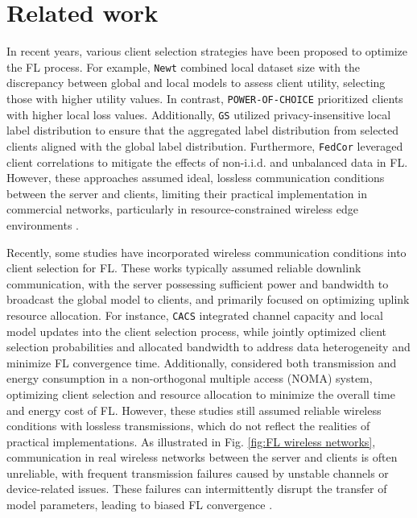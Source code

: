 \section{Related work}
In recent years, various client selection strategies have been proposed to optimize the FL process.
For example,
\texttt{Newt} \cite{zhao2022participant} combined local dataset size with the discrepancy between global and local models to assess client utility, selecting those with higher utility values.
In contrast, \texttt{POWER-OF-CHOICE} \cite{cho2022towards} prioritized clients with higher local loss values.
Additionally, \texttt{GS} \cite{ma2021client} utilized privacy-insensitive local label distribution to ensure that the aggregated label distribution from selected clients aligned with the global label distribution.
Furthermore, \texttt{FedCor} \cite{tang2022fedcor} leveraged client correlations to mitigate the effects of non-i.i.d. and unbalanced data in FL.
However, these approaches assumed ideal, lossless communication conditions between the server and clients,
limiting their practical implementation in commercial networks, particularly in resource-constrained wireless edge environments \cite{xu2025distributed, liu2024survey}.

Recently, some studies have incorporated wireless communication conditions into client selection for FL.
These works typically assumed reliable downlink communication, with the server possessing sufficient power and bandwidth to broadcast the global model to clients, and primarily focused on optimizing uplink resource allocation.
For instance,
\texttt{CACS} \cite{qiao2020content} integrated channel capacity and local model updates into the client selection process, while \cite{luo2024adaptive} jointly optimized client selection probabilities and allocated bandwidth to address data heterogeneity and minimize FL convergence time.
Additionally, \cite{wu2024client} considered both transmission and energy consumption in a non-orthogonal multiple access (NOMA) system, optimizing client selection and resource allocation to minimize the overall time and energy cost of FL.
However, these studies still assumed reliable wireless conditions with lossless transmissions, which do not reflect the realities of practical implementations.
As illustrated in Fig. \ref{fig:FL wireless networks}, communication in real wireless networks between the server and clients is often unreliable, with frequent transmission failures caused by unstable channels or device-related issues.
These failures can intermittently disrupt the transfer of model parameters, leading to biased FL convergence \cite{salehi2021federated,wang2021robust}.

